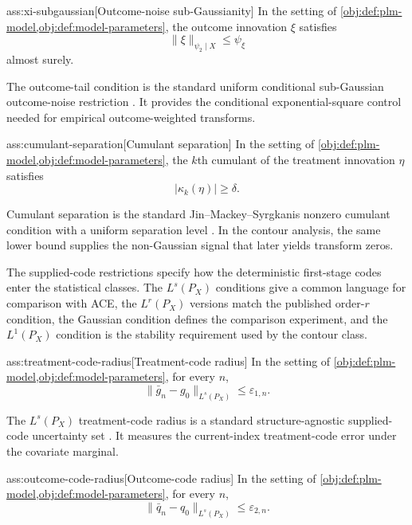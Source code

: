 \begin{assumptionv}{ass:xi-subgaussian}[Outcome-noise sub-Gaussianity]
In the setting of \cref{obj:def:plm-model,obj:def:model-parameters}, the outcome innovation \(\xi\) satisfies
\[
\lVert \xi\rVert_{\psi_2\mid X}\le\psi_{\xi}
\]
almost surely.
\end{assumptionv}

The outcome-tail condition is the standard uniform conditional sub-Gaussian outcome-noise restriction \citep{JinMackeySyrgkanis2025}. It provides the conditional exponential-square control needed for empirical outcome-weighted transforms.

\begin{assumptionv}{ass:cumulant-separation}[Cumulant separation]
In the setting of \cref{obj:def:plm-model,obj:def:model-parameters}, the \(k\)th cumulant of the treatment innovation \(\eta\) satisfies
\[
|\kappa_k(\eta)|\ge\delta.
\]
\end{assumptionv}

Cumulant separation is the standard Jin--Mackey--Syrgkanis nonzero cumulant condition with a uniform separation level \citep{JinMackeySyrgkanis2025}. In the contour analysis, the same lower bound supplies the non-Gaussian signal that later yields transform zeros.

The supplied-code restrictions specify how the deterministic first-stage codes enter the statistical classes. The \(L^s(P_X)\) conditions give a common language for comparison with ACE, the \(L^r(P_X)\) versions match the published order-\(r\) condition, the Gaussian condition defines the comparison experiment, and the \(L^1(P_X)\) condition is the stability requirement used by the contour class.

\begin{assumptionv}{ass:treatment-code-radius}[Treatment-code radius]
In the setting of \cref{obj:def:plm-model,obj:def:model-parameters}, for every \(n\),
\[
\lVert \bar g_n-g_0\rVert_{L^s(P_X)}\le\varepsilon_{1,n}.
\]
\end{assumptionv}

The \(L^s(P_X)\) treatment-code radius is a standard structure-agnostic supplied-code uncertainty set \citep{JinMackeySyrgkanis2025}. It measures the current-index treatment-code error under the covariate marginal.

\begin{assumptionv}{ass:outcome-code-radius}[Outcome-code radius]
In the setting of \cref{obj:def:plm-model,obj:def:model-parameters}, for every \(n\),
\[
\lVert \bar q_n-q_0\rVert_{L^s(P_X)}\le\varepsilon_{2,n}.
\]
\end{assumptionv}

